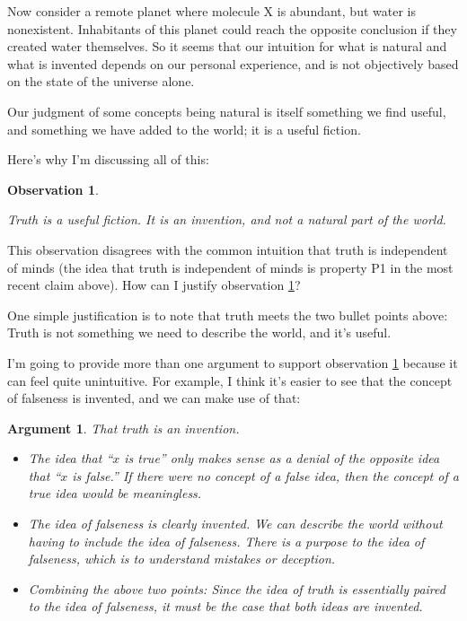 \documentclass[11pt, oneside]{article}
\newtheorem{obs}{Observation}
\newtheorem*{argt}{Argument}
\begin{document}
Now consider a remote planet where molecule X is abundant, but water is
nonexistent. Inhabitants of this planet could reach the opposite conclusion if
they created water themselves. So it seems that our intuition for what is
natural and what is invented depends on our personal experience, and is
not objectively based on the state of the universe alone.

Our judgment of some concepts being natural is itself something
we find useful, and something we have added to the world; it is a useful
fiction.

Here's why I'm discussing all of this:
\newcommand{\obsthree}{
    Truth is a useful fiction. It is an invention, and not a natural part of the
    world.
}
\begin{obs}\label{o3}
    \obsthree
\end{obs}

This observation disagrees with the common intuition that truth is
independent of minds (the idea that truth is independent of minds is
property P1 in the most recent claim above).
How can I justify observation \ref{o3}?

One simple justification is to note that truth meets the two bullet points
above: Truth is not something we need to describe the world, and it's useful.

I'm going to provide more than one argument to support observation \ref{o3}
because it can feel quite unintuitive.
For example, I think it's easier to see that the concept
of falseness is invented, and we can make use of that:
\begin{argt} That truth is an invention.
    \label{a2}
    \normalfont
    \begin{itemize}
        \item
            The idea that ``$x$ is true'' only makes sense as a denial of the
            opposite idea that ``$x$ is false.'' If there were no concept of a
            false idea, then the concept of a true idea would be meaningless.
        \item
            The idea of falseness is clearly invented. We can describe
            the world without having to include the idea of falseness.
            There is a purpose to the idea of falseness, which is to understand
            mistakes or deception.
        \item
            Combining the above two points:
            Since the idea of truth is essentially paired to the idea of
            falseness,
            it must be the case that both ideas are invented.
    \end{itemize}
\end{argt}
\end{document}
